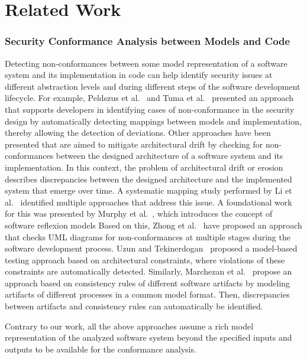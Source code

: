 \section{Related Work}
\label{sec:related}



\subsubsection{Security Conformance Analysis between Models and Code}
Detecting non-conformances between some model representation of a software system and its implementation in code can help identify security issues at different abstraction levels and during different steps of the software development lifecycle.
For example, Peldszus et al.~\cite{Peldszus19_data_flow_compliance} and Tuma et al.~\cite{Tuma23_security_compliance} presented an approach that supports developers in identifying cases of non-conformance in the security design by automatically detecting mappings between models and implementation, thereby allowing the detection of deviations.
Other approaches have been presented that are aimed to mitigate architectural drift by checking for non-conformances between the designed architecture of a software system and its implementation.
In this context, the problem of architectural drift or erosion describes discrepancies between the designed architecture and the implemented system that emerge over time.
A systematic mapping study performed by Li et al.~\cite{Li22_architecture_erosion} identified multiple approaches that address this issue.
A foundational work for this was presented by Murphy et al.~\cite{Murphy01_software}, which introduces the concept of software reflexion models 
Based on this, Zhong et al.~\cite{zhong23_domico} have proposed an approach that checks UML diagrams for non-conformances at multiple stages during the software development process.
Uzun and Tekinerdogan~\cite{Uzun19_architecture_conformance} proposed a model-based testing approach based on architectural constraints, where violations of these constraints are automatically detected.
Similarly, Marchezan et al.~\cite{Marchezan23_consistency_checks} propose an approach based on consistency rules of different software artifacts by modeling artifacts of different processes in a common model format.
Then, discrepancies between artifacts and consistency rules can automatically be identified.

Contrary to our work, all the above approaches assume a rich model representation of the analyzed software system beyond the specified inputs and outputs to be available for the conformance analysis.





